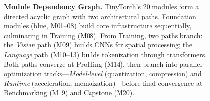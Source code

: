 \begin{figure}[t]
{\begin{tikzpicture}
    \end{tikzpicture}%
    }
    \caption{\textbf{Module Dependency Graph.} TinyTorch's 20 modules form a directed acyclic graph with two architectural paths. Foundation modules (blue, M01--08) build core infrastructure sequentially, culminating in Training (M08). From Training, two paths branch: the \emph{Vision} path (M09) builds CNNs for spatial processing; the \emph{Language} path (M10--13) builds tokenization through transformers. Both paths converge at Profiling (M14), then branch into parallel optimization tracks---\emph{Model-level} (quantization, compression) and \emph{Runtime} (acceleration, memoization)---before final convergence at Benchmarking (M19) and Capstone (M20).}
    \label{fig:module-flow}
    \end{figure}